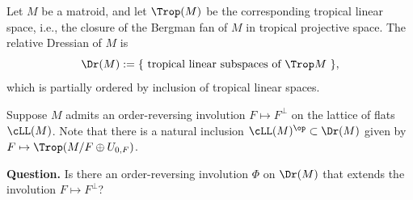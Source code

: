 Let $M$ be a matroid, and let $\Trop(M)$ be the corresponding tropical linear space, i.e., the closure of the Bergman fan of $M$ in tropical projective space. The relative Dressian of $M$ is 
\[ \Dr(M) :=\{\text{ tropical linear subspaces of $\Trop M$ }\}, \]
which is partially ordered by inclusion of tropical linear spaces. 

Suppose $M$ admits an order-reversing involution $F\mapsto F^\perp$ on the lattice of flats $\cLL(M)$. Note that there is a natural inclusion $\cLL(M)^{\op} \subset \Dr(M)$ given by $F\mapsto \Trop(M/F\oplus U_{0,F})$.

\medskip
\noindent \textbf{Question.}  Is there an order-reversing involution $\Phi$ on $\Dr(M)$ that extends the involution $F\mapsto F^\perp$?